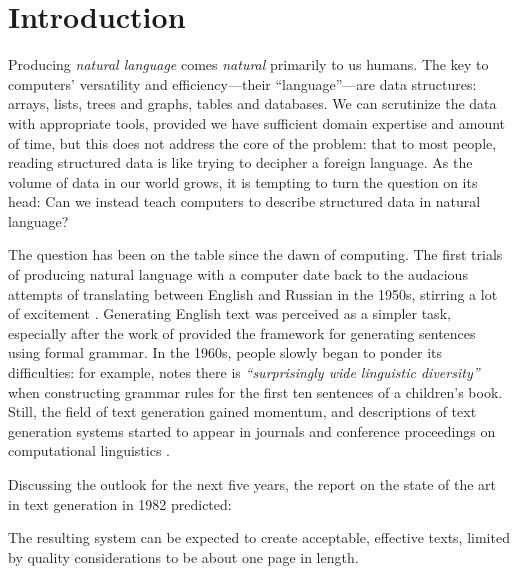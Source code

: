 \chapter{Introduction}
\label{chap:intro}
Producing \emph{natural language} comes \emph{natural} primarily to us humans.
The key to computers' versatility and efficiency---their ``language''---are data structures: arrays, lists, trees and graphs, tables and databases.
We can scrutinize the data with appropriate tools, provided we have sufficient domain expertise and amount of time, but this does not address the core of the problem: that to most people, reading structured data is like trying to decipher a foreign language. As the volume of data in our world grows, it is tempting to turn the question on its head: Can we instead teach computers to describe structured data in natural language?


The question has been on the table since the dawn of computing. The first trials of producing natural language with a computer date back to the audacious attempts of translating between English and Russian in the 1950s, stirring a lot of excitement \cite{sheridan1955research}. Generating English text was perceived as a simpler task, especially after the work of \citet{chomsky1957syntactic} provided the framework for generating sentences using formal grammar. In the 1960s, people slowly began to ponder its difficulties: for example, \citet{yngve1961random} notes there is \emph{``surprisingly wide linguistic diversity''} when constructing grammar rules for the first ten sentences of a children's book. Still, the field of text generation gained momentum, and descriptions of text generation systems started to appear in journals and conference proceedings on computational linguistics \cite[\emph{inter alia}]{woolley-1969-automatic,meehan-1975-using,mcdonald-1975-framework,wang-1980-computational}.

Discussing the outlook for the next five years, the report on the state of the art in text generation in 1982 predicted:
\begin{pquotation}{\citealp{mann-1982-text}}
    The resulting system can be expected to create acceptable, effective texts, limited by quality considerations to be about one page in length.\hspace{2cm}
\end{pquotation}


